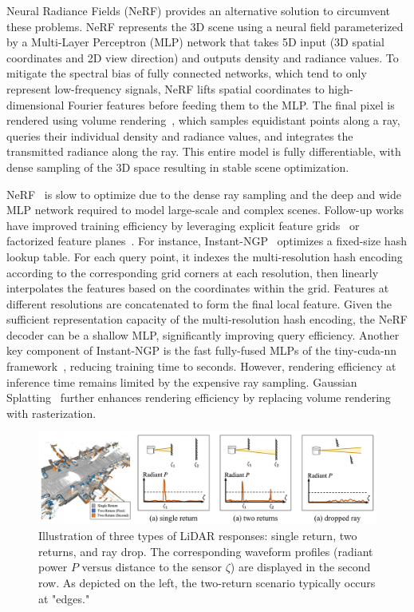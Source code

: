 Neural Radiance Fields (NeRF)\cite{mildenhall2020nerf} provides an alternative solution to circumvent these problems. NeRF represents the 3D scene using a neural field parameterized by a Multi-Layer Perceptron (MLP) network that takes 5D input (3D spatial coordinates and 2D view direction) and outputs density and radiance values. To mitigate the spectral bias\cite{tancik2020fourier} of fully connected networks, which tend to only represent low-frequency signals, NeRF lifts spatial coordinates to high-dimensional Fourier features before feeding them to the MLP. The final pixel is rendered using volume rendering~\cite{levoy1990efficient,max1995optical}, which samples equidistant points along a ray, queries their individual density and radiance values, and integrates the transmitted radiance along the ray. This entire model is fully differentiable, with dense sampling of the 3D space resulting in stable scene optimization. 

NeRF~\cite{mildenhall2020nerf} is slow to optimize due to the dense ray sampling and the deep and wide MLP network required to model large-scale and complex scenes. Follow-up works have improved training efficiency by leveraging explicit feature grids~\cite{mueller2022instant,SunSC22,fridovich2022plenoxels,yu2021plenoxels} or factorized feature planes~\cite{chen2022tensorf,kplanes_2023}. For instance, Instant-NGP~\cite{mueller2022instant} optimizes a fixed-size hash lookup table. For each query point, it indexes the multi-resolution hash encoding according to the corresponding grid corners at each resolution, then linearly interpolates the features based on the coordinates within the grid. Features at different resolutions are concatenated to form the final local feature. Given the sufficient representation capacity of the multi-resolution hash encoding, the NeRF decoder can be a shallow MLP, significantly improving query efficiency. Another key component of Instant-NGP is the fast fully-fused MLPs of the tiny-cuda-nn framework~\cite{tiny-cuda-nn}, reducing training time to seconds. However, rendering efficiency at inference time remains limited by the expensive ray sampling. Gaussian Splatting~\cite{kerbl20233d} further enhances rendering efficiency by replacing volume rendering with rasterization.


\begin{figure}[t]
    \centering
    \includegraphics[width=1.0\columnwidth]{imgs/lidar_nvs.pdf}
    \caption{Illustration of three types of LiDAR responses: single return, two returns, and ray drop. The corresponding waveform profiles (radiant power $P$ versus distance to the sensor $\zeta$) are displayed in the second row. As depicted on the left, the two-return scenario typically occurs at "edges."}
    \label{fig:bg_lidar}
\end{figure}

